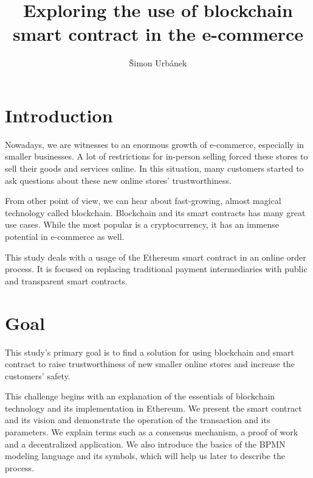 \documentclass[thesis=M,english]{FITthesis}[2019/12/23]
\title{Exploring the use of blockchain smart contract in the e-commerce}
\author{Šimon Urbánek} %
\begin{document}




\chapter{Introduction}


%
%


Nowadays, we are witnesses to an enormous growth of e-commerce, especially in smaller businesses. A lot of restrictions for in-person selling forced these stores to sell their goods and services online. In this situation, many customers started to ask questions about these new online stores' trustworthiness.

From other point of view, we can hear about fast-growing, almost magical technology called blockchain. Blockchain and its smart contracts has many great use cases. While the most popular is a cryptocurrency, it has an immense potential in e-commerce as well. 

This study deals with a usage of the Ethereum smart contract in an online order process. It is focused on replacing traditional payment intermediaries with public and transparent smart contracts.




\chapter{Goal}

This study's primary goal is to find a solution for using blockchain and smart contract to raise trustworthiness of new smaller online stores and increase the customers' safety.

This challenge begins with an explanation of the essentials of blockchain technology and its implementation in Ethereum. We present the smart contract and its vision and demonstrate the operation of the transaction and its parameters. We explain terms such as a consensus mechanism, a proof of work and a decentralized application. We also introduce the basics of the BPMN modeling language and its symbols, which will help us later to describe the process.
\end{document}
